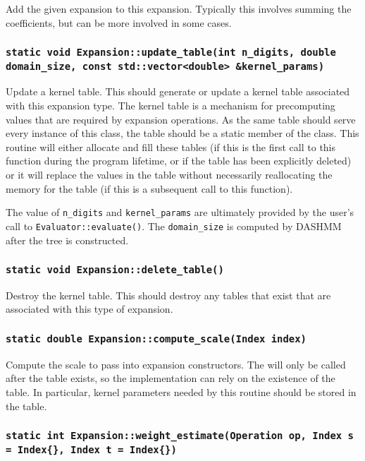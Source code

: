 Add the given expansion to this expansion. Typically this involves summing the
coefficients, but can be more involved in some cases.

\subsubsection{\texttt{static void Expansion::update\_table(int n\_digits, double domain\_size, const std::vector<double> \&kernel\_params)}}

Update a kernel table. This should generate or update a kernel table associated
with this expansion type. The kernel table is a mechanism for precomputing
values that are required by expansion operations. As the same table should
serve every instance of this class, the table should be a static member of the
class. This routine will either allocate and fill these tables (if this is the
first call to this function during the program lifetime, or if the table has
been explicitly deleted) or it will replace the values in the table without
necessarily reallocating the memory for the table (if this is a subsequent call
to this function).

The value of \texttt{n\_digits} and \texttt{kernel\_params} are ultimately
provided by the user's call to \texttt{Evaluator::evaluate()}. The
\texttt{domain\_size} is computed by DASHMM after the tree is constructed.

\subsubsection{\texttt{static void Expansion::delete\_table()}}

Destroy the kernel table. This should destroy any tables that exist that are
associated with this type of expansion.

\subsubsection{\texttt{static double Expansion::compute\_scale(Index index)}}

Compute the scale to pass into expansion constructors. The will only be called
after the table exists, so the implementation can rely on the existence of the
table. In particular, kernel parameters needed by this routine should be
stored in the table.

\subsubsection{\texttt{static int Expansion::weight\_estimate(Operation op, Index s = Index\{\}, Index t = Index\{\})}}

